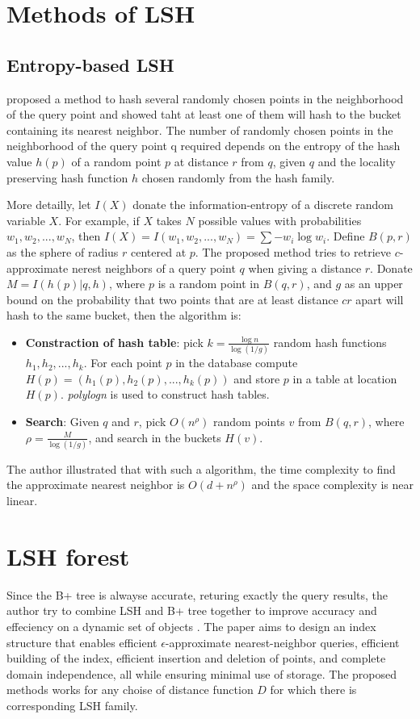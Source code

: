 
\section{Methods of LSH}
\subsection{Entropy-based LSH}
\cite{panigrahy2006entropy} proposed a method to hash several randomly chosen points in the neighborhood of the query point and showed taht at least one of them will hash to the bucket containing its nearest neighbor. The number of randomly chosen points in the neighborhood of the query point q required depends on the entropy of the hash value $h(p)$ of a random point $p$ at distance $r$ from $q$, given $q$ and the locality preserving hash function $h$ chosen randomly from the hash family.

More detailly, let $I(X)$ donate the information-entropy of a discrete random variable $X$. For example, if $X$ takes $N$ possible values with probabilities $w_1, w_2, ..., w_N$, then $I(X)=I(w_1, w_2, ..., w_N)=\sum -w_i\log w_i$. Define $B(p, r)$ as the sphere of radius $r$ centered at $p$. The proposed method tries to retrieve $c$-approximate nerest neighbors of a query point $q$ when giving a distance $r$. Donate $M=I(h(p)|q, h)$, where $p$ is a random point in $B(q, r)$, and $g$ as an upper bound on the probability that two points that are at least distance $cr$ apart will hash to the same bucket, then the algorithm is:
\begin{itemize}
	\item \textbf{Constraction of hash table}: pick $k=\frac{\log n}{\log (1/g)}$ random hash functions $h_1, h_2, ..., h_k$. For each point $p$ in the database compute $H(p)=(h_1(p), h_2(p), ..., h_k(p))$ and store $p$ in a table at location $H(p)$. \textit{polylogn} is used to construct hash tables.
	\item \textbf{Search}: Given $q$ and $r$, pick $O(n^\rho)$ random points $v$ from $B(q, r)$, where $\rho=\frac{M}{\log(1/g)}$, and search in the buckets $H(v)$.
\end{itemize}

The author illustrated that with such a algorithm, the time complexity to find the approximate nearest neighbor is $O(d+n^\rho)$ and the space complexity is near linear.
\section{LSH forest}
Since the B+ tree is alwayse accurate, returing exactly the query results, the author try to combine LSH and B+ tree together to improve accuracy and effeciency on a dynamic set of objects \cite{bawa2005lsh}. The paper aims to design an index structure that enables efficient $\epsilon$-approximate nearest-neighbor queries, efficient building of the index, efficient insertion and deletion of points, and complete domain independence, all while ensuring minimal use of storage. The proposed methods works for any choise of distance function $D$ for which there is corresponding LSH family.

